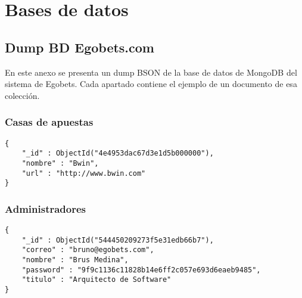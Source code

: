 \chapter{Bases de datos} 
\label{chap:dbs} 


\section{Dump BD Egobets.com} 

En este anexo se presenta un dump BSON de la base de datos de MongoDB del sistema de Egobets. Cada apartado contiene el ejemplo de un documento de esa colección.



\subsection{Casas de apuestas}
\lstset{language=javascript}
\begin{lstlisting} 
{
	"_id" : ObjectId("4e4953dac67d3e1d5b000000"),
	"nombre" : "Bwin",
	"url" : "http://www.bwin.com"
} 
\end{lstlisting}

\subsection{Administradores}
\begin{lstlisting} 
{
	"_id" : ObjectId("544450209273f5e31edb66b7"),
	"correo" : "bruno@egobets.com",
	"nombre" : "Brus Medina",
	"password" : "9f9c1136c11828b14e6ff2c057e693d6eaeb9485",
	"titulo" : "Arquitecto de Software"
} 
\end{lstlisting}


